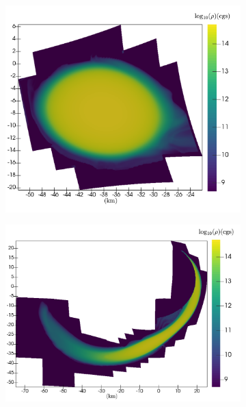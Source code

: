 \begin{figure}
	\centering
	\begin{subfigure}[b]{0.475\textwidth}
		\centering
		\includegraphics[width=1.0\linewidth]{images/rho_DD2_M12-m4ms-inertial}
		\label{fig:rho_M12_DD2_m4ms}
	\end{subfigure}
	\begin{subfigure}[b]{0.475\textwidth}
		\centering
		\includegraphics[width=\linewidth]{images/rho_DD2_M12-m1ms-inertial}
		\label{fig:rho_M12_DD2_m1ms}
		\centering
	\end{subfigure}
	\begin{subfigure}[b]{0.475\textwidth}

\end{subfigure}
\end{figure}
